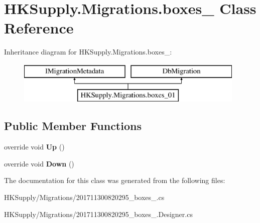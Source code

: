 \hypertarget{class_h_k_supply_1_1_migrations_1_1boxes__01}{}\section{H\+K\+Supply.\+Migrations.\+boxes\+\_ Class Reference}
\label{class_h_k_supply_1_1_migrations_1_1boxes__01}
Inheritance diagram for H\+K\+Supply.\+Migrations.\+boxes\+\_\+:\begin{figure}[H]
\begin{center}
\leavevmode
\includegraphics[height=2.000000cm]{class_h_k_supply_1_1_migrations_1_1boxes__01}
\end{center}
\end{figure}
\subsection*{Public Member Functions}
\begin{DoxyCompactItemize}
\item 
\mbox{\label{class_h_k_supply_1_1_migrations_1_1boxes__01_a484614e7f9a902fe97e60c3dfbf1a3f5}} 
override void {\bfseries Up} ()
\item 
\mbox{\label{class_h_k_supply_1_1_migrations_1_1boxes__01_a952920c01bedb60a29ef13a139b1d579}} 
override void {\bfseries Down} ()
\end{DoxyCompactItemize}


The documentation for this class was generated from the following files\+:\begin{DoxyCompactItemize}
\item 
H\+K\+Supply/\+Migrations/201711300820295\+\_\+boxes\+\_.\+cs\item 
H\+K\+Supply/\+Migrations/201711300820295\+\_\+boxes\+\_.\+Designer.\+cs\end{DoxyCompactItemize}
